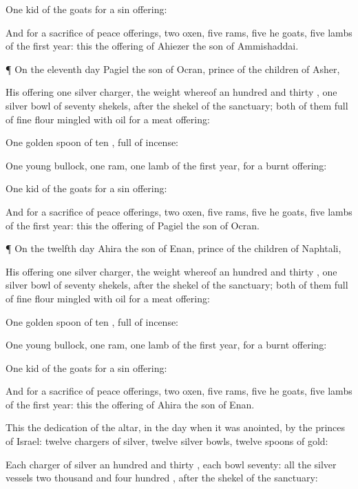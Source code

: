 {One
kid of the
goats for a sin
offering:

And for a
sacrifice of peace
offerings,
two
oxen,
five
rams,
five he
goats,
five
lambs of the
first
year: this
{} the
offering of
Ahiezer the
son of
Ammishaddai.


\par }{\PP {}¶ On the
eleventh
day
Pagiel the
son of
Ocran,
prince of the
children of
Asher,
{}

His
offering
{}
one
silver
charger, the
weight whereof
{} an
hundred and
thirty
{},
one
silver
bowl of
seventy
shekels, after the
shekel of the
sanctuary;
both of them
full of fine
flour
mingled with
oil for a meat
offering:

One
golden
spoon of
ten
{},
full of
incense:

One
young
bullock,
one
ram,
one
lamb of the
first
year, for a burnt
offering:

One
kid of the
goats for a sin
offering:

And for a
sacrifice of peace
offerings,
two
oxen,
five
rams,
five he
goats,
five
lambs of the
first
year: this
{} the
offering of
Pagiel the
son of
Ocran.


\par }{\PP {}¶ On the
twelfth
day
Ahira the
son of
Enan,
prince of the
children of
Naphtali,
{}

His
offering
{}
one
silver
charger, the
weight whereof
{} an
hundred and
thirty
{},
one
silver
bowl of
seventy
shekels, after the
shekel of the
sanctuary;
both of them
full of fine
flour
mingled with
oil for a meat
offering:

One
golden
spoon of
ten
{},
full of
incense:

One
young
bullock,
one
ram,
one
lamb of the
first
year, for a burnt
offering:

One
kid of the
goats for a sin
offering:

And for a
sacrifice of peace
offerings,
two
oxen,
five
rams,
five he
goats,
five
lambs of the
first
year: this
{} the
offering of
Ahira the
son of
Enan.

This
{} the
dedication of the
altar, in the
day when it was
anointed, by the
princes of
Israel:
twelve
chargers of
silver, twelve
silver
bowls,
twelve
spoons of
gold:

Each
charger of
silver
{} an
hundred and
thirty
{},
each
bowl
seventy: all the
silver
vessels
{} two
thousand and
four
hundred
{}, after the
shekel of the
sanctuary:

}
